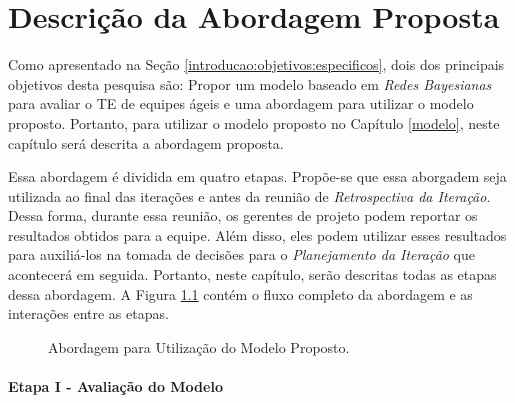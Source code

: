 \chapter{Descrição da Abordagem Proposta}
\label{descricao}

Como apresentado na Seção \ref{introducao:objetivos:especificos}, dois dos principais objetivos desta pesquisa são: Propor um modelo baseado em \textit{Redes Bayesianas} para avaliar o TE de equipes ágeis e uma abordagem para utilizar o modelo proposto. Portanto, para utilizar o modelo proposto no Capítulo \ref{modelo}, neste capítulo será descrita a abordagem proposta.

Essa abordagem é dividida em quatro etapas. Propõe-se que essa aborgadem seja utilizada ao final das iterações e antes da reunião de \textit{Retrospectiva da Iteração}. Dessa forma, durante essa reunião, os gerentes de projeto podem reportar os resultados obtidos para a equipe. Além disso, eles podem utilizar esses resultados para auxiliá-los na tomada de decisões para o \textit{Planejamento da Iteração} que acontecerá em seguida. Portanto, neste capítulo, serão descritas todas as etapas dessa abordagem. A Figura \ref{descricao:etapas} contém o fluxo completo da abordagem e as interações entre as etapas.

\begin{figure}[ht!]
\begin{center}
	\end{center}
	\caption{Abordagem para Utilização do Modelo Proposto.}
	\label{descricao:etapas}
\end{figure}

\subsubsection{Etapa I - Avaliação do Modelo}
\label{descricao:avaliacao}

